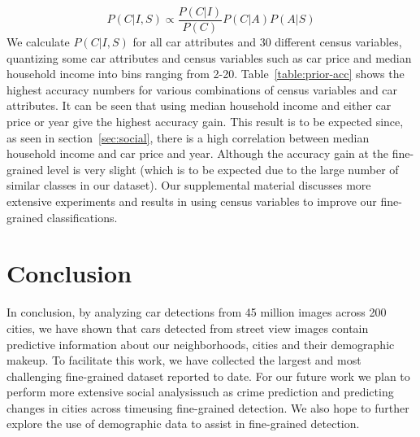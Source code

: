 \documentclass[10pt,twocolumn,letterpaper]{article}
\begin{document}
\begin{equation}
  P(C|I,S) \propto \frac{P(C|I)}{P(C)}P(C|A)P(A|S)
\end{equation}
We calculate \(P(C|I,S)\) for all car attributes and 30 different census variables, quantizing some car attributes and census variables such as car price and median household income into bins ranging from 2-20. Table~\ref{table:prior-acc} shows the highest accuracy numbers for various combinations of census variables and car attributes. It can be seen that using median household income and either car price or year give the highest accuracy gain. This result is to be expected since, as seen in section~\ref{sec:social}, there is a high correlation between median household income and car price and year. Although the accuracy gain at the fine-grained level is very slight (which is to be expected due to the large number of similar classes in our dataset). Our supplemental material discusses more extensive experiments and results in using census variables to improve our fine-grained classifications.

\section{Conclusion}
In conclusion, by analyzing car detections from 45 million images across 200 cities, we have shown that cars detected from street view images contain predictive information about our neighborhoods, cities and their demographic makeup. To facilitate this work, we have collected the largest and most challenging fine-grained dataset reported to date. For our future work we plan to perform more extensive social analysis\textemdash such as crime prediction and predicting changes in cities across time\textemdash using fine-grained detection. We also hope to further explore the use of demographic data to assist in fine-grained detection. 
{\small


}
\end{document}
